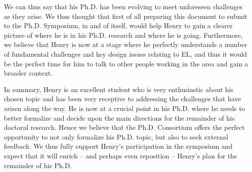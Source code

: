 \documentclass[sigconf]{acmart}
\begin{document}
We can thus say that his Ph.D. has been evolving to meet unforeseen challenges as they arise. We thus thought that first of all preparing this document to submit to the Ph.D. Symposium, in and of itself, would help Henry to gain a clearer picture of where he is in his Ph.D. research and where he is going. Furthermore, we believe that Henry is now at a stage where he perfectly understands a number of fundamental challenges and key design issues relating to EL, and thus it would be the perfect time for him to talk to other people working in the area and gain a broader context.

In summary, Henry is an excellent student who is very enthusiastic about his chosen topic and has been very receptive to addressing the challenges that have arisen along the way. He is now at a crucial point in his Ph.D. where he needs to better formalize and decide upon the main directions for the remainder of his doctoral research. Hence we believe that the Ph.D. Consortium offers the perfect opportunity to not only formalize his Ph.D. topic, but also to seek external feedback. We thus fully support Henry's participation in the symposium and expect that it will enrich -- and perhaps even reposition -- Henry's plan for the remainder of his Ph.D.
\end{document}
